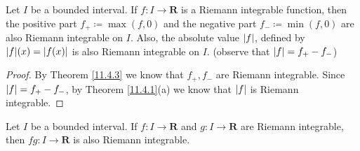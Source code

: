 \begin{corollary}\label{11.4.4}
    \quad
    Let \(I\) be a bounded interval.
    If \(f : I \to \mathbf{R}\) is a Riemann integrable function, then the positive part \(f_+ \coloneqq \max(f, 0)\) and the negative part \(f_- \coloneqq \min(f, 0)\) are also Riemann integrable on \(I\).
    Also, the absolute value \(\abs*{f}\), defined by \(\abs*{f}(x) = \abs*{f(x)}\) is also Riemann integrable on \(I\).
    (observe that \(\abs*{f} = f_+ - f_-\))
\end{corollary}

\begin{proof}
    By Theorem \ref{11.4.3} we know that \(f_+, f_-\) are Riemann integrable.
    Since \(\abs*{f} = f_+ - f_-\), by Theorem \ref{11.4.1}(a) we know that \(\abs*{f}\) is Riemann integrable.
\end{proof}

\begin{theorem}\label{11.4.5}
    Let \(I\) be a bounded interval.
    If \(f : I \to \mathbf{R}\) and \(g : I \to \mathbf{R}\) are Riemann integrable, then \(fg : I \to \mathbf{R}\) is also Riemann integrable.
\end{theorem}


